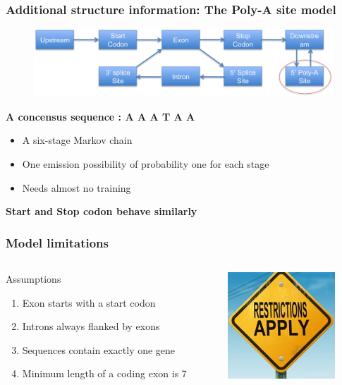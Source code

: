 \documentclass{beamer}[12pt]
\begin{document}
\begin{frame}
\frametitle{Additional structure information: The Poly-A site model}
	\begin{figure}
		\includegraphics[width=1.0\textwidth]{../picturesforthepresentation/PolyA.png}
	\end{figure}
	
	\textbf{A concensus sequence : A A A T A A}
	
	\begin{itemize}
		\item A six-stage Markov chain
		\item One emission possibility of probability one for each stage 
		\item Needs almost no training 
	\end{itemize}
	
	\textbf{Start and Stop codon behave similarly}
\end{frame}

\begin{frame}
	\frametitle{Model limitations}
	\begin{columns}
		\begin{column}{6.5cm}
			Assumptions
			\begin{enumerate}
				\item Exon starts with a start codon
				\item Introns always flanked by exons
				\item Sequences contain exactly one gene
				\item Minimum length of a coding exon is 7
			\end{enumerate}
		\end{column}
		\begin{column}{4.5cm}
			\includegraphics[width=4cm]{../picturesforthepresentation/restrictions.jpg}
		\end{column}
	\end{columns}
\end{frame}
\end{document}
